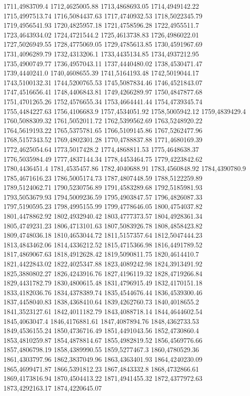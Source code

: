 1711,4983709.4
1712,4625005.88
1713,4868693.05
1714,4949142.22
1715,4997513.74
1716,5084437.63
1717,4740932.53
1718,5022345.79
1719,4956541.93
1720,4825957.18
1721,4758596.28
1722,4955511.7
1723,4643934.02
1724,4721544.2
1725,4613738.83
1726,4986022.01
1727,5026949.55
1728,4775069.05
1729,4785613.85
1730,4591967.69
1731,4096289.79
1732,4313206.1
1733,4435134.85
1734,4937212.95
1735,4900749.77
1736,4957043.11
1737,4440480.02
1738,4530471.47
1739,4440241.0
1740,4608655.39
1741,5164193.48
1742,5019044.17
1743,5100132.31
1744,5200765.53
1745,5087834.46
1746,4521843.07
1747,4516656.41
1748,4406843.81
1749,4266289.97
1750,4847877.68
1751,4701265.26
1752,4576655.34
1753,4664441.44
1754,4739345.74
1755,4484227.63
1756,4106683.9
1757,4534051.92
1758,5005942.12
1759,4839429.4
1760,5088309.32
1761,5052011.72
1762,5399562.69
1763,5248920.22
1764,5619193.22
1765,5375781.65
1766,5109145.86
1767,5262477.96
1768,5157343.52
1769,4802301.28
1770,4788837.88
1771,4680169.39
1772,4625054.64
1773,5017428.2
1774,4868811.53
1775,4648638.37
1776,5035984.49
1777,4837144.34
1778,4453464.75
1779,4223842.62
1780,4436451.4
1781,4535457.86
1782,4040688.91
1783,4560848.92
1784,4390780.9
1785,4671616.23
1786,5005174.73
1787,4807448.59
1788,5122259.89
1789,5124062.71
1790,5230756.89
1791,4583289.68
1792,5185981.93
1793,5053679.93
1794,5009236.59
1795,4903847.57
1796,4826087.33
1797,5190595.23
1798,4995155.99
1799,4778646.05
1800,4754037.82
1801,4478862.92
1802,4932940.42
1803,4777373.57
1804,4928361.34
1805,4749231.23
1806,4713101.63
1807,5083926.78
1808,4858423.82
1809,4748036.18
1810,4653044.72
1811,5157357.64
1812,5047444.23
1813,4843462.06
1814,4336212.52
1815,4715366.98
1816,4491789.52
1817,4869067.63
1818,4912628.42
1819,5090811.75
1820,4614410.7
1821,4422843.02
1822,4025347.88
1823,4089242.98
1824,3913491.92
1825,3880802.27
1826,4243916.76
1827,4196119.32
1828,4719266.84
1829,4431782.79
1830,4800615.48
1831,4796915.49
1832,4170151.18
1833,4182036.76
1834,4378389.74
1835,4544676.44
1836,4539300.46
1837,4458040.83
1838,4368410.64
1839,4262760.73
1840,4018655.2
1841,3523127.61
1842,4011182.79
1843,4088718.14
1844,4644602.54
1845,4063047.4
1846,4176881.61
1847,4087894.76
1848,4362733.53
1849,4536155.24
1850,4736716.49
1851,4491043.56
1852,4730860.4
1853,4810259.87
1854,4878814.67
1855,4982819.52
1856,4569776.66
1857,4806798.19
1858,4389990.55
1859,5277467.3
1860,4780529.36
1861,4303797.96
1862,3837049.96
1863,4363401.93
1864,4240230.09
1865,4699471.87
1866,5391812.23
1867,4843332.8
1868,4732866.61
1869,4173816.94
1870,4504413.22
1871,4941455.32
1872,4377972.63
1873,4292163.17
1874,4220645.07
